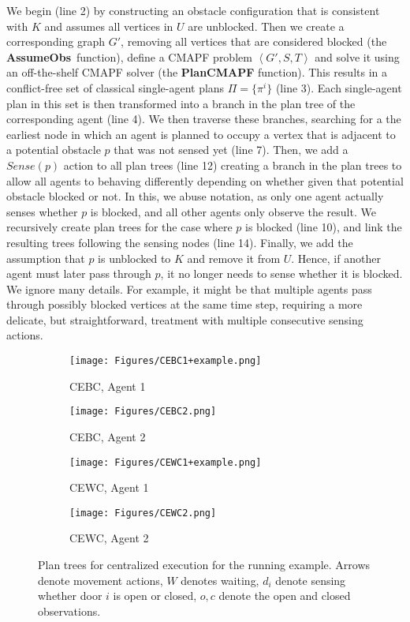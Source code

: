 \documentclass[letterpaper]{article} %
\newcommand{\assumeObs}{\textbf{AssumeObs}}
\newcommand{\tuple}[1]{\ensuremath{\left \langle #1 \right \rangle }}
\begin{document}
We begin (line 2) by constructing an obstacle configuration that is consistent with $K$ and assumes all vertices in $U$ are unblocked.
Then we create a corresponding graph $G'$, removing all vertices that are considered blocked (the \assumeObs\ function), define a CMAPF problem $\tuple{G',S,T}$ and solve it using an off-the-shelf CMAPF solver  (the \textbf{PlanCMAPF} function).
This results in a conflict-free set of classical single-agent plans $\Pi=\{\pi^i\}$  (line 3). Each single-agent plan in this set is then transformed into a branch in the plan tree of the corresponding agent (line 4).
We then traverse these branches, searching for a the earliest node in which an agent is planned to occupy a vertex that is adjacent to a potential obstacle $p$ that was not sensed yet (line 7).
Then, we add a $Sense(p)$ action to all plan trees (line 12)  creating a branch in the plan trees to allow all agents to behaving differently depending on whether given that potential obstacle blocked or not.
In this, we abuse notation, as only one agent actually senses whether $p$ is blocked, and all other agents only observe the result.
We recursively create plan trees for the case where $p$ is blocked (line 10), and link the resulting trees following the sensing nodes (line 14).
Finally, we add the assumption that $p$ is unblocked to $K$ and remove it from $U$. Hence, if another agent must later pass through $p$, it no longer needs to sense whether it is blocked.
We ignore many details. For example, it might be that multiple agents pass through possibly blocked vertices at the same time step, requiring a more delicate, but straightforward, treatment with multiple consecutive sensing actions.



\begin{figure}[t]
    \begin{subfigure}[b]{0.4\textwidth}
      \texttt{[image: Figures/CEBC1+example.png]}
      \caption{CEBC, Agent 1}\label{fig:CEBC1}
    \end{subfigure}
    \begin{subfigure}[b]{0.4\textwidth}
      \texttt{[image: Figures/CEBC2.png]}
      \caption{CEBC, Agent 2}\label{fig:CEBC2}
    \end{subfigure}

    \begin{subfigure}[b]{0.4\textwidth}
      \texttt{[image: Figures/CEWC1+example.png]}
      \caption{CEWC, Agent 1}\label{fig:CEWC1}
    \end{subfigure}
    \begin{subfigure}[b]{0.4\textwidth}
      \texttt{[image: Figures/CEWC2.png]}
      \caption{CEWC, Agent 2}\label{fig:CEWC2}
    \end{subfigure}
    \caption{Plan trees for centralized execution for the running example. Arrows denote movement actions, $W$ denotes waiting, $d_i$ denote sensing whether door $i$ is open or closed, $o,c$ denote the open and closed observations.}

\end{figure}
\end{document}
